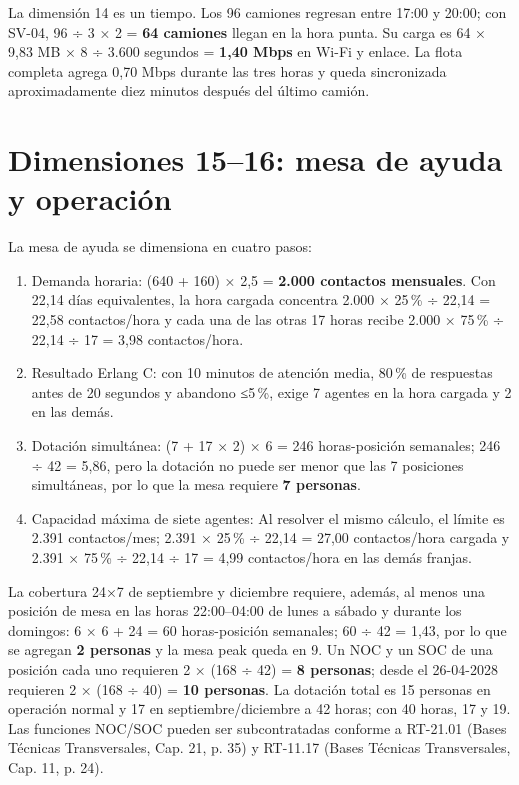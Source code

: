 La dimensión 14 es un tiempo. Los 96 camiones regresan entre 17:00 y 20:00; con SV-04, 96 ÷ 3 × 2 = \textbf{64 camiones} llegan en la hora punta. Su carga es 64 × 9,83 MB × 8 ÷ 3.600 segundos = \textbf{1,40 Mbps} en Wi-Fi y enlace. La flota completa agrega 0,70 Mbps durante las tres horas y queda sincronizada aproximadamente diez minutos después del último camión.

\section{Dimensiones 15--16: mesa de ayuda y operación}
\label{sec:anexo-4b-dimensiones-15-16}

La mesa de ayuda se dimensiona en cuatro pasos:

\begin{enumerate}
  \item Demanda horaria: (640 + 160) × 2,5 = \textbf{2.000 contactos mensuales}. Con 22,14 días equivalentes, la hora cargada concentra 2.000 × 25\,\% ÷ 22,14 = 22,58 contactos/hora y cada una de las otras 17 horas recibe 2.000 × 75\,\% ÷ 22,14 ÷ 17 = 3,98 contactos/hora.
  \item Resultado Erlang C: con 10 minutos de atención media, 80\,\% de respuestas antes de 20 segundos y abandono ≤5\,\%, exige 7 agentes en la hora cargada y 2 en las demás.
  \item Dotación simultánea: (7 + 17 × 2) × 6 = 246 horas-posición semanales; 246 ÷ 42 = 5,86, pero la dotación no puede ser menor que las 7 posiciones simultáneas, por lo que la mesa requiere \textbf{7 personas}.
  \item Capacidad máxima de siete agentes: Al resolver el mismo cálculo, el límite es 2.391 contactos/mes; 2.391 × 25\,\% ÷ 22,14 = 27,00 contactos/hora cargada y 2.391 × 75\,\% ÷ 22,14 ÷ 17 = 4,99 contactos/hora en las demás franjas.
\end{enumerate}

La cobertura 24×7 de septiembre y diciembre requiere, además, al menos una posición de mesa en las horas 22:00–04:00 de lunes a sábado y durante los domingos: 6 × 6 + 24 = 60 horas-posición semanales; 60 ÷ 42 = 1,43, por lo que se agregan \textbf{2 personas} y la mesa peak queda en 9. Un NOC y un SOC de una posición cada uno requieren 2 × (168 ÷ 42) = \textbf{8 personas}; desde el 26-04-2028 requieren 2 × (168 ÷ 40) = \textbf{10 personas}. La dotación total es 15 personas en operación normal y 17 en septiembre/diciembre a 42 horas; con 40 horas, 17 y 19. Las funciones NOC/SOC pueden ser subcontratadas conforme a RT-21.01 (Bases Técnicas Transversales, Cap. 21, p. 35) y RT-11.17 (Bases Técnicas Transversales, Cap. 11, p. 24).

